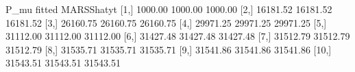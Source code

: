 \begin{Schunk}
\begin{Soutput}
          P_mu   fitted MARSShatyt
 [1,]  1000.00  1000.00    1000.00
 [2,] 16181.52 16181.52   16181.52
 [3,] 26160.75 26160.75   26160.75
 [4,] 29971.25 29971.25   29971.25
 [5,] 31112.00 31112.00   31112.00
 [6,] 31427.48 31427.48   31427.48
 [7,] 31512.79 31512.79   31512.79
 [8,] 31535.71 31535.71   31535.71
 [9,] 31541.86 31541.86   31541.86
[10,] 31543.51 31543.51   31543.51
\end{Soutput}
\end{Schunk}
